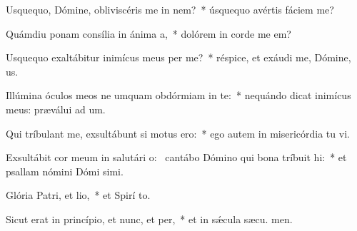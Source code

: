 \item Usquequo, Dómine, obliviscéris me in nem?~* úsquequo avértis fáciem   me?
\item Quámdiu ponam consília in ánima a,~* dolórem in corde me  em?
\item Usquequo exaltábitur inimícus meus per me?~* réspice, et exáudi me, Dómine,  us.
\item Illúmina óculos meos ne umquam obdórmiam in te:~* nequándo dicat inimícus meus: præválui ad um.
\item Qui tríbulant me, exsultábunt si motus ero:~* ego autem in misericórdia tu vi.
\item Exsultábit cor meum in salutári o:~\pscross{} cantábo Dómino qui bona tríbuit hi:~* et psallam nómini Dómi simi.
\item Glória Patri, et lio,~* et Spirí to.
\item Sicut erat in princípio, et nunc, et per,~* et in sǽcula sæcu. men.
